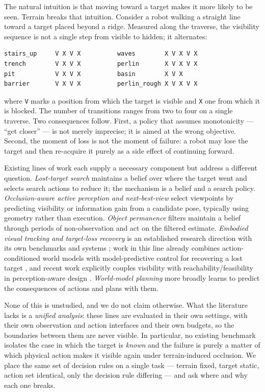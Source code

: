 \documentclass[utf8]{FrontiersinHarvard}
\begin{document}
The natural intuition is that moving toward a target makes it more likely to be seen.
Terrain breaks that intuition. Consider a robot walking a straight line toward a target
placed beyond a ridge. Measured along the traverse, the visibility sequence is not a
single step from visible to hidden; it alternates:

\begin{verbatim}
stairs_up     V X V X          waves        X V X V X
trench        V X V X          perlin       X V X V X
pit           V X V X          basin        X V X
barrier       V X V X          perlin_rough X V X V X
\end{verbatim}

where \texttt{V} marks a position from which the target is visible and \texttt{X} one
from which it is blocked. The number of transitions ranges from two to four on a single
traverse. Two consequences follow. First, a policy that assumes monotonicity ---
``get closer'' --- is not merely imprecise; it is aimed at the wrong objective. Second,
the moment of loss is not the moment of failure: a robot may lose the target and then
re-acquire it purely as a side effect of continuing forward.

Existing lines of work each supply a necessary component but address a different
question. \emph{Lost-target search} \citep{RadmardCroft2016,Radmard2018} maintains a
belief over where the target went and selects search actions to reduce it; the
mechanism is a belief and a search policy. \emph{Occlusion-aware active perception and
next-best-view} \citep{OANBV,LEAPNBV} select viewpoints by predicting visibility or
information gain from a candidate pose, typically using geometry rather than execution.
\emph{Object permanence} filters \citep{Peng2024} maintain a belief through periods of
non-observation and act on the filtered estimate. \emph{Embodied visual tracking and
target-loss recovery} is an established research direction with its own benchmarks and
systems \citep{TrackVLA,EVTBench}; work in this line already combines action-conditioned
world models with model-predictive control for recovering a lost target
\citep{CSTWM}, and recent work explicitly couples visibility with
reachability/feasibility in perception-aware design \citep{VisibleReachable}.
\emph{World-model planning} more broadly \citep{Yin2025,Wu2024,RoboticWorldModel}
learns to predict the consequences of actions and plans with them.

None of this is unstudied, and we do not claim otherwise. What the literature lacks is
a \emph{unified analysis}: these lines are evaluated in their own settings, with their
own observation and action interfaces and their own budgets, so the boundaries between
them are never visible. In particular, no existing benchmark isolates the case in which
the target is \emph{known} and the failure is purely a matter of which physical action
makes it visible again under terrain-induced occlusion. We place the same set of
decision rules on a single task --- terrain fixed, target static, action set identical,
only the decision rule differing --- and ask where and why each one breaks.
\end{document}
